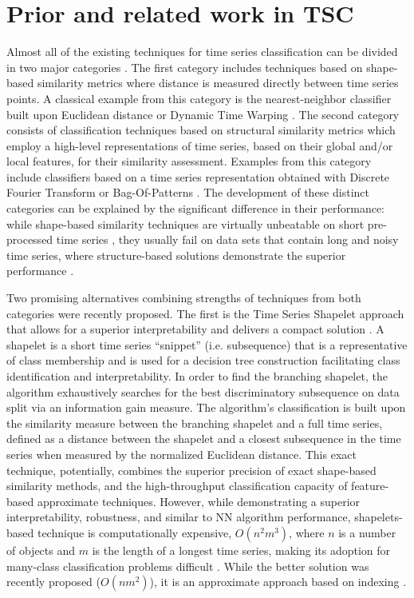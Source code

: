 \section{Prior and related work in TSC} \label{sax_vsm_prior}
Almost all of the existing techniques for time series classification can be divided in two major categories \cite{citeulike:11796594}. 
The first category includes techniques based on shape-based similarity metrics where distance is measured directly between 
time series points. A classical example from this category is the nearest-neighbor classifier built upon Euclidean distance 
\cite{citeulike:4214336} or Dynamic Time Warping \cite{senin2008dynamic}. 
The second category consists of classification techniques based on structural similarity metrics which employ a high-level 
representations of time series, based on their global and/or local features, for their similarity assessment. 
Examples from this category include classifiers based on a time series representation obtained with 
Discrete Fourier Transform \cite{citeulike:5094223} or Bag-Of-Patterns \cite{citeulike:10525778}. 
The development of these distinct categories can be explained by the significant difference in their performance: 
while shape-based similarity techniques are virtually unbeatable on short pre-processed time series \cite{citeulike:532340}, 
they usually fail on data sets that contain long and noisy time series, 
where structure-based solutions demonstrate the superior performance \cite{citeulike:10525778}. 

Two promising alternatives combining strengths of techniques from both categories were recently proposed.
The first is the Time Series Shapelet approach that allows for a superior interpretability and delivers a compact 
solution \cite{citeulike:7344347}. 
A shapelet is a short time series ``snippet'' (i.e. subsequence) that is a representative of class membership and is used for 
a decision tree construction facilitating class identification and interpretability.
In order to find the branching shapelet, the algorithm exhaustively searches for the best discriminatory subsequence on data split 
via an information gain measure. The algorithm's classification is built upon the similarity measure between the branching 
shapelet and a full time series, defined as a distance between the shapelet and a closest subsequence in the time series 
when measured by the normalized Euclidean distance. This exact technique, potentially, combines the superior precision of 
exact shape-based similarity methods, and the high-throughput classification capacity of feature-based approximate techniques. 
However, while demonstrating a superior interpretability, robustness, and similar to NN algorithm performance, shapelets-based 
technique is computationally expensive, $O(n^{2}m^{3})$, where $n$ is a number of objects and $m$ is the length of a longest 
time series, making its adoption for many-class classification problems difficult \cite{citeulike:11345338}. 
While the better solution was recently proposed ($O(nm^{2})$), it is an approximate approach based on indexing \cite{citeulike:12563493}.

